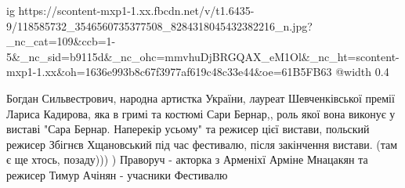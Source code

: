  
 
 
 
 
\ifcmt
  ig https://scontent-mxp1-1.xx.fbcdn.net/v/t1.6435-9/118585732_3546560735377508_8284318045432382216_n.jpg?_nc_cat=109&ccb=1-5&_nc_sid=b9115d&_nc_ohc=mmvhuDjBRGQAX_eM1Ol&_nc_ht=scontent-mxp1-1.xx&oh=1636e993b8c67f3977af619c48c33e44&oe=61B5FB63
  @width 0.4
\fi


Богдан Сильвестрович, народна артистка України, лауреат Шевченківської премії
Лариса Кадирова, яка в гримі та костюмі Сари Бернар,, роль якої вона виконує у
виставі "Сара Бернар. Наперекір усьому" та режисер цієї вистави, польский
режисер Збігнєв Хщановський під час фестивалю, після закінчення вистави. (там є
ще хтось, позаду))) ) Праворуч - акторка з Арменіхї Арміне Мнацакян та режисер
Тимур Ачінян - учасники Фестивалю
